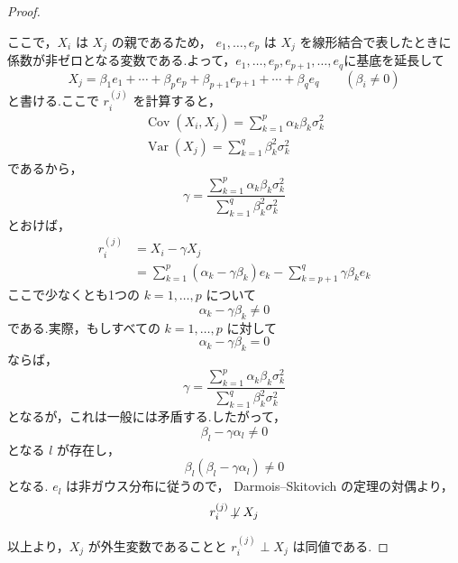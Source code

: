 \documentclass[uplatex, dvipdfmx]{jsarticle}
\begin{document}
\begin{proof}
\begin{itemize}
    ここで，$X_i$ は $X_j$ の親であるため，
    $e_1,\ldots,e_p$ は $X_j$ を線形結合で表したときに
    係数が非ゼロとなる変数である.よって，$e_1, \dots, e_p, e_{p+1}, \dots ,e_q$に基底を延長して
    \[
      X_j = \beta_1 e_1 + \cdots + \beta_pe_p + \beta_{p+1} e_{p+1} + \cdots + \beta_q e_q \qquad (\beta_i\neq0)
    \]
    と書ける.ここで $r_i^{(j)}$ を計算すると，
    \begin{align}
      \operatorname{Cov}(X_i,X_j) = \sum_{k=1}^{p} \alpha_k \beta_k \sigma_k^2 \\
      \operatorname{Var}(X_j) = \sum_{k=1}^{q} \beta_k^2 \sigma_k^2
    \end{align}
    であるから，
    \[
      \gamma = \frac{\sum_{k=1}^{p} \alpha_k \beta_k \sigma_k^2}{\sum_{k=1}^{q} \beta_k^2 \sigma_k^2}
    \]
    とおけば，
    \begin{align}
      r_i^{(j)} &= X_i - \gamma X_j\\
      &=\sum_{k=1}^{p} (\alpha_k - \gamma \beta_k) e_k - \sum_{k=p+1}^{q} \gamma \beta_k e_k
    \end{align}
    ここで少なくとも1つの $k=1,\ldots,p$ について
    \[
      \alpha_k - \gamma \beta_k \neq 0
    \]
    である.実際，もしすべての $k=1,\ldots ,p$ に対して
    \[
      \alpha_k-\gamma\beta_k=0
    \]
    ならば，
    \[
      \gamma = \frac{\sum_{k=1}^{p} \alpha_k \beta_k \sigma_k^2}{\sum_{k=1}^{q} \beta_k^2 \sigma_k^2}
    \]
    となるが，これは一般には矛盾する.したがって，
    \[
      \beta_l - \gamma \alpha_l \neq 0
    \]
    となる $l$ が存在し，
    \[
      \beta_l (\beta_l - \gamma \alpha_l) \neq 0
    \]
    となる.
    $e_l$ は非ガウス分布に従うので，
    Darmois--Skitovich の定理の対偶より，
    \[
      r_i^{(j)} \not \! \perp X_j
    \]
  \end{itemize}  

  以上より，$X_j$ が外生変数であることと $r_i^{(j)} \perp X_j$ は同値である.
\end{proof}
\end{document}
